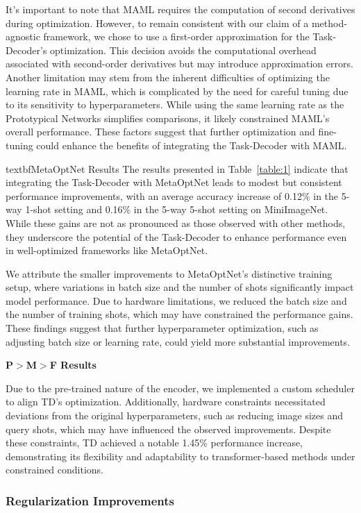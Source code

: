 It's important to note that MAML requires the computation of second derivatives during optimization. However, to remain consistent with our claim of a method-agnostic framework, we chose to use a first-order approximation for the Task-Decoder's optimization. This decision avoids the computational overhead associated with second-order derivatives but may introduce approximation errors. Another limitation may stem from the inherent difficulties of optimizing the learning rate in MAML, which is complicated by the need for careful tuning due to its sensitivity to hyperparameters. While using the same learning rate as the Prototypical Networks simplifies comparisons, it likely constrained MAML's overall performance. These factors suggest that further optimization and fine-tuning could enhance the benefits of integrating the Task-Decoder with MAML.
  
textbf{MetaOptNet Results}
The results presented in Table~\ref{table:1} indicate that integrating the Task-Decoder with MetaOptNet \cite{lee2019meta} leads to modest but consistent performance improvements, with an average accuracy increase of 0.12\% in the 5-way 1-shot setting and 0.16\% in the 5-way 5-shot setting on MiniImageNet. While these gains are not as pronounced as those observed with other methods, they underscore the potential of the Task-Decoder to enhance performance even in well-optimized frameworks like MetaOptNet.

We attribute the smaller improvements to MetaOptNet's distinctive training setup, where variations in batch size and the number of shots significantly impact model performance. Due to hardware limitations, we reduced the batch size and the number of training shots, which may have constrained the performance gains. These findings suggest that further hyperparameter optimization, such as adjusting batch size or learning rate, could yield more substantial improvements.

\textbf{P$>$M$>$F Results}

Due to the pre-trained nature of the encoder, we implemented a custom scheduler to align TD's optimization. Additionally, hardware constraints necessitated deviations from the original hyperparameters, such as reducing image sizes and query shots, which may have influenced the observed improvements. Despite these constraints, TD achieved a notable 1.45\% performance increase, demonstrating its flexibility and adaptability to transformer-based methods under constrained conditions.
  
\subsubsection{Regularization Improvements}


